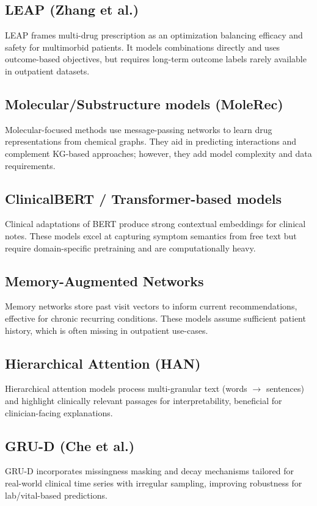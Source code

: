 \documentclass[conference,onecolumn]{IEEEtran}
\begin{document}
\subsection{LEAP (Zhang et al.)}
LEAP frames multi-drug prescription as an optimization balancing efficacy and safety for multimorbid patients. It models combinations directly and uses outcome-based objectives, but requires long-term outcome labels rarely available in outpatient datasets.

\subsection{Molecular/Substructure models (MoleRec)}
Molecular-focused methods use message-passing networks to learn drug representations from chemical graphs. They aid in predicting interactions and complement KG-based approaches; however, they add model complexity and data requirements.

\subsection{ClinicalBERT / Transformer-based models}
Clinical adaptations of BERT produce strong contextual embeddings for clinical notes. These models excel at capturing symptom semantics from free text but require domain-specific pretraining and are computationally heavy.

\subsection{Memory-Augmented Networks}
Memory networks store past visit vectors to inform current recommendations, effective for chronic recurring conditions. These models assume sufficient patient history, which is often missing in outpatient use-cases.

\subsection{Hierarchical Attention (HAN)}
Hierarchical attention models process multi-granular text (words $\rightarrow$ sentences) and highlight clinically relevant passages for interpretability, beneficial for clinician-facing explanations.

\subsection{GRU-D (Che et al.)}
GRU-D incorporates missingness masking and decay mechanisms tailored for real-world clinical time series with irregular sampling, improving robustness for lab/vital-based predictions.
\end{document}
